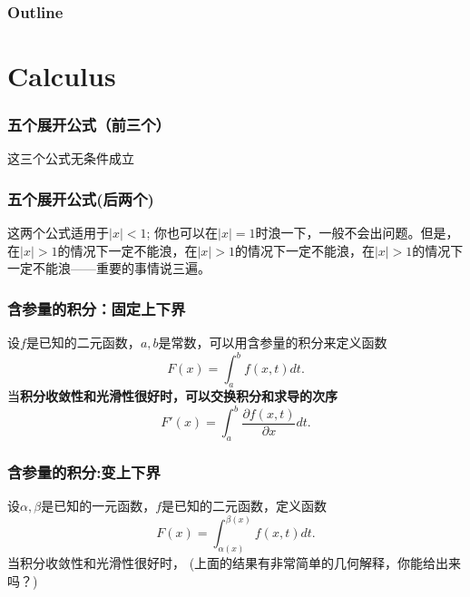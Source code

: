 \documentclass[CJK,13pt]{beamer}
\date{}
\begin{document}
  \bch
{}

\begin{frame}
\frametitle{Outline}
\tableofcontents
\end{frame}

\section{Calculus}


\begin{frame}
  \frametitle{五个展开公式（前三个）}
  这三个公式无条件成立
\end{frame}


\begin{frame}
  \frametitle{五个展开公式(后两个)}
  这两个公式{\blue 适用于$|x|< 1$}; 你也可以在$|x|=1$时浪一下，一般不会出问题。但是，{\blue 在$|x|>1$的情况下一定不能浪，在$|x|>1$的情况下一定不能浪，在$|x|>1$的情况下一定不能浪}——重要的事情说三遍。
\end{frame}





\begin{frame}
  \frametitle{含参量的积分：固定上下界}
  设$f$是已知的二元函数，$a,b$是常数，可以用含参量的积分来定义函数
  $$F(x) =\int_a^b f(x, t) dt.$$
  当{\bf 积分收敛性和光滑性很好时，可以交换积分和求导的次序}
  $$F'(x) =\int_a^b \frac{\partial f(x, t)}{\partial x} dt.$$  
\end{frame}


\begin{frame}
  \frametitle{含参量的积分:变上下界}
  设$\alpha,\beta$是已知的一元函数，$f$是已知的二元函数，定义函数
  $$F(x) =\int_{\alpha(x)}^{\beta(x)} f(x, t) dt.$$
  当积分收敛性和光滑性很好时，
  {\scriptsize (上面的结果有非常简单的几何解释，你能给出来吗？)}
  
\end{frame}
\end{document}
